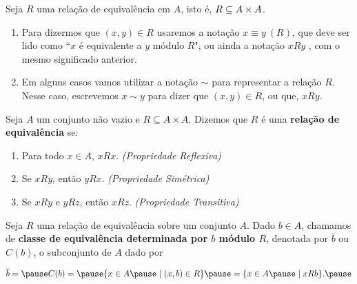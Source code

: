 \documentclass{beamer}
\begin{document}
    \begin{frame}
        \begin{observacoes}
            Seja $R$ uma rela{\c c}{\~a}o de equival{\^e}ncia em $A$, \pause isto \'e, $R \subseteq A \times A$.\pause
            \begin{enumerate}[label={\arabic*})]
                \item  Para dizermos que $(x, y) \in R$ \pause usaremos a nota{\c c}{\~a}o $x\equiv y\ (R)$, \pause que deve ser lido como ``$x$ \'e equivalente a $y$ m{\'o}dulo $R$", \pause ou ainda a nota{\c c}{\~a}o $xRy$ \pause, com o mesmo significado anterior.\pause\vspace{.2cm}

                \item Em alguns casos vamos utilizar a nota\c{c}\~ao $\sim$ \pause para representar a rela\c{c}\~ao $R$. \pause Nesse caso, escrevemos $x \sim y$ \pause para dizer que $(x, y) \in R$, \pause ou que, $xRy$.\pause
            \end{enumerate}
        \end{observacoes}

        \begin{definicao}
            Seja $A$ um conjunto n{\~a}o vazio \pause e $R\subseteq A \times A$. \pause Dizemos que $R$ {\'e} uma \textbf{rela{\c c}{\~a}o de equival{\^e}ncia} se:\pause
            \begin{enumerate}[label={\roman*})]
                \item Para todo $x \in A$, $xRx$. \textit{(Propriedade Reflexiva)}\pause\vspace{.2cm}

                \item Se $xRy$, ent\~ao $yRx$. \textit{(Propriedade Sim\'etrica)}\pause\vspace{.2cm}

                \item Se $xRy$ e $yRz$, ent\~ao $xRz$. \textit{(Propriedade Transitiva)}\pause
            \end{enumerate}
        \end{definicao}
    \end{frame}
    \begin{frame}
        \begin{definicao}
            Seja $R$ uma rela{\c c}{\~a}o de equival{\^e}ncia sobre um conjunto $A$. \pause Dado $b \in A$, \pause chamamos de \textbf{classe de equival{\^e}ncia \pause determinada por $b$ \pause m{\'o}dulo $R$}\pause, denotada por $\overline{b}$ \pause ou $C(b)$, \pause o subconjunto de $A$ \pause dado por\pause
            \begin{center}
                $\overline{b} =\pause C(b) = \pause \{x \in A \pause \mid (x,b) \in R\}\pause = \{x \in A \pause\mid xRb\}.\pause$
            \end{center}
        \end{definicao}
    \end{frame}
\end{document}
